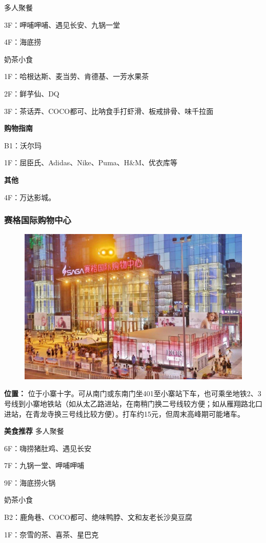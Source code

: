 \documentclass[
decoration,  %
]{qyxf-book}
\begin{document}
多人聚餐

3F：呷哺呷哺、遇见长安、九锅一堂

4F：海底捞

奶茶小食

1F：哈根达斯、麦当劳、肯德基、一芳水果茶

2F：鲜芋仙、DQ

3F：茶话弄、COCO都可、比呐食手打虾滑、板戒排骨、味千拉面

\textbf{购物指南}

B1：沃尔玛

1F：屈臣氏、Adidas、Nike、Puma、H\&M、优衣库等

\textbf{其他}

4F：万达影城。

\subsubsection{赛格国际购物中心}


\begin{figure}[htbp]
	\centering
	\includegraphics[width=0.8\linewidth]{pics/image22.jpg}
\end{figure}

\textbf{位置：}
位于小寨十字。可从南门或东南门坐401至小寨站下车，也可乘坐地铁2、3号线到小寨地铁站（如从太乙路进站，在南稍门换二号线较方便；如从雁翔路北口进站，在青龙寺换三号线比较方便）。打车约15元，但周末高峰期可能堵车。

\textbf{美食推荐}
多人聚餐

6F：嗨捞猪肚鸡、遇见长安

7F：九锅一堂、呷哺呷哺

9F：海底捞火锅

奶茶小食

B2：鹿角巷、COCO都可、绝味鸭脖、文和友老长沙臭豆腐

1F：奈雪的茶、喜茶、星巴克
\end{document}
